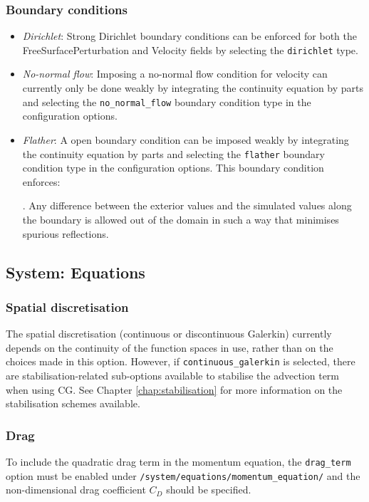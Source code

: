 \documentclass[a4paper,11pt]{report}
\begin{document}
\subsubsection{Boundary conditions}
\begin{itemize}
   \item \textit{Dirichlet}: Strong Dirichlet boundary conditions can be enforced for both the FreeSurfacePerturbation and Velocity fields by selecting the \texttt{dirichlet} type.
   \item \textit{No-normal flow}: Imposing a no-normal flow condition for velocity can currently only be done weakly by integrating the continuity equation by parts and selecting the \texttt{no\_normal\_flow} boundary condition type in the configuration options.
   \item \textit{Flather}: A \cite{Flather_1976} open boundary condition can be imposed weakly by integrating the continuity equation by parts and selecting the \texttt{flather} boundary condition type in the configuration options. This boundary condition enforces:
   
   
   . Any difference between the exterior values and the simulated values along the boundary is allowed out of the domain in such a way that minimises spurious reflections.
\end{itemize}

\subsection{System: Equations}

\subsubsection{Spatial discretisation}
The spatial discretisation (continuous or discontinuous Galerkin) currently depends on the continuity of the function spaces in use, rather than on the choices made in this option. However, if \texttt{continuous\_galerkin} is selected, there are stabilisation-related sub-options available to stabilise the advection term when using CG. See Chapter \ref{chap:stabilisation} for more information on the stabilisation schemes available.

\subsubsection{Drag}
To include the quadratic drag term in the momentum equation, the \texttt{drag\_term} option must be enabled under \texttt{/system/equations/momentum\_equation/} and the non-dimensional drag coefficient $C_D$ should be specified.
\end{document}
